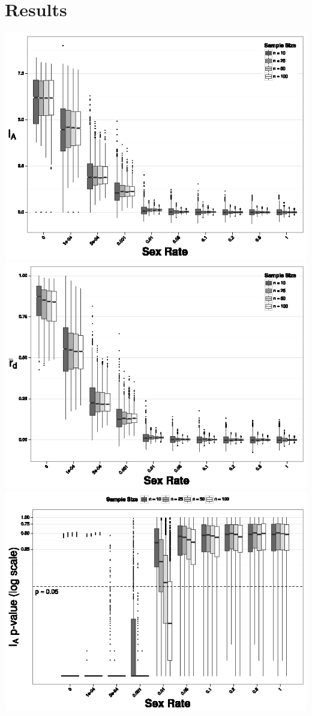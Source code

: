 \documentclass[letterpaper, 10pt]{article}
\begin{document}
\section{Results}

\includegraphics{figures/Ia_chart.eps}
\includegraphics{figures/rbarD_chart.eps}\\
\includegraphics{figures/Ia_pval.eps}
\end{document}
